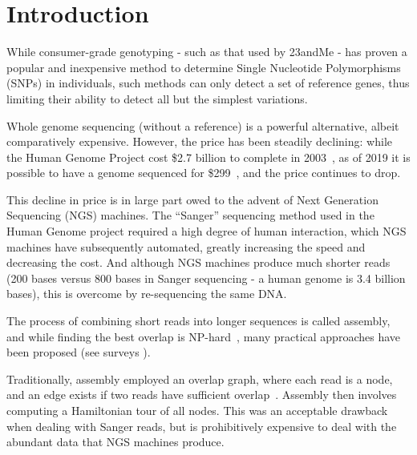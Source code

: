 \chapter{Introduction}
\label{chp:introduction}

While consumer-grade genotyping - such as that used by 23andMe - has proven a popular and inexpensive method to determine Single Nucleotide Polymorphisms (SNPs) in individuals, such methods can only detect a set of reference genes, thus limiting their ability to detect all but the simplest variations.

Whole genome sequencing (without a reference) is a powerful alternative, albeit comparatively expensive. However, the price has been steadily declining: while the Human Genome Project cost \$2.7 billion to complete in 2003~\cite{HGP}, as of 2019 it is possible to have a genome sequenced for \$299~\cite{dantelabscost}, and the price continues to drop.

This decline in price is in large part owed to the advent of Next Generation Sequencing (NGS) machines. The “Sanger” sequencing method used in the Human Genome project required a high degree of human interaction, which NGS machines have subsequently automated, greatly increasing the speed and decreasing the cost. And although NGS machines produce much shorter reads (200 bases versus 800 bases in Sanger sequencing - a human genome is 3.4 billion bases), this is overcome by re-sequencing the same DNA.


The process of combining short reads into longer sequences is called assembly, and while finding the best overlap is NP-hard~\cite{Mye95}, many practical approaches have been proposed (see surveys \cite{KasMor06, MilKor10, Pop09}).

Traditionally, assembly employed an overlap graph, where each read is a node, and an edge exists if two reads have sufficient overlap~\cite{BatJaf02,HuaYan05,MyeSut00}. Assembly then involves computing a Hamiltonian tour of all nodes. This was an acceptable drawback when dealing with Sanger reads, but is prohibitively expensive to deal with the abundant data that NGS machines produce.

